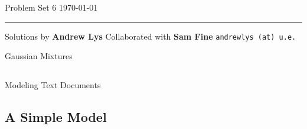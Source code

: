 \documentclass{amsart}
\theoremstyle{definition}
\begin{document}
\noindent
Problem Set 6   \hfill \today  %
\smallskip
\hrule
\smallskip
\noindent
Solutions by {\bf Andrew Lys} \qquad Collaborated with {\bf Sam Fine}   %
  {\tt andrewlys (at) u.e.}      %

\vspace{0.5cm}

\begin{center}
\LARGE Gaussian Mixtures
\end{center}
\subsection{}
\begin{center}
\LARGE Modeling Text Documents
\end{center}
\subsection{A Simple Model}
\end{document}
